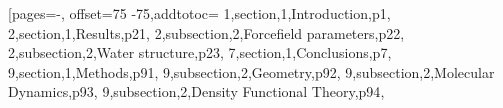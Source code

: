 

[pages=-, offset=75 -75,addtotoc={
     1,section,1,Introduction,p1,
     2,section,1,Results,p21,
     2,subsection,2,Forcefield parameters,p22,
     2,subsection,2,Water structure,p23,
     7,section,1,Conclusions,p7,
     9,section,1,Methods,p91,
     9,subsection,2,Geometry,p92,
     9,subsection,2,Molecular Dynamics,p93,
     9,subsection,2,Density Functional Theory,p94},

